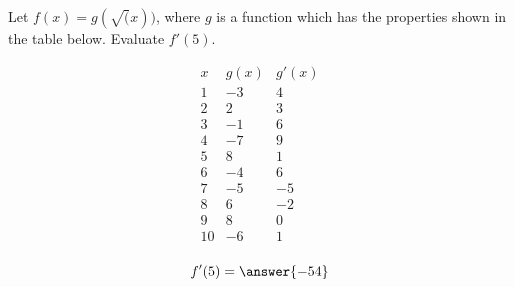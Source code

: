 \documentclass{ximera}
\author{Steven Gubkin}
\begin{document}
\begin{exercise}


Let $f(x) = g(\sqrt(x))$, where $g$ is a function which has the properties shown in the table below.  Evaluate $f'(5)$.

\[
\begin{array}{c|c|c}
 x & g(x) & g'(x)\\ \hline
1 & -3 & 4\\
2 & 2 & 3\\
3 & -1 & 6\\
4 & -7 & 9\\
5 & 8 & 1\\
6 & -4 & 6\\
7 & -5 & -5\\
8 & 6 & -2\\
9 & 8 & 0\\
10 & -6 & 1\\
\end{array}
\]

\begin{prompt}
	$$f'(5) = \answer{-54}$$
\end{prompt}


\end{exercise}
\end{document}
